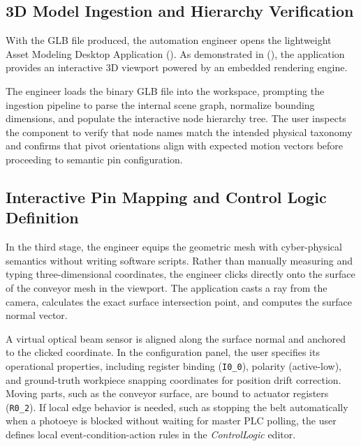 \subsection{3D Model Ingestion and Hierarchy Verification}
With the \gls{GLB} file produced, the automation engineer opens the lightweight Asset Modeling Desktop Application (). As demonstrated in  (), the application provides an interactive 3D viewport powered by an embedded rendering engine. 

The engineer loads the binary \gls{GLB} file into the workspace, prompting the ingestion pipeline to parse the internal scene graph, normalize bounding dimensions, and populate the interactive node hierarchy tree. The user inspects the component to verify that node names match the intended physical taxonomy and confirms that pivot orientations align with expected motion vectors before proceeding to semantic pin configuration.

\subsection{Interactive Pin Mapping and Control Logic Definition}
In the third stage, the engineer equips the geometric mesh with cyber-physical semantics without writing software scripts. Rather than manually measuring and typing three-dimensional coordinates, the engineer clicks directly onto the surface of the conveyor mesh in the viewport. The application casts a ray from the camera, calculates the exact surface intersection point, and computes the surface normal vector.

A virtual optical beam sensor is aligned along the surface normal and anchored to the clicked coordinate. In the configuration panel, the user specifies its operational properties, including register binding (\texttt{I0\_0}), polarity (active-low), and ground-truth workpiece snapping coordinates for position drift correction. Moving parts, such as the conveyor surface, are bound to actuator registers (\texttt{R0\_2}). If local edge behavior is needed, such as stopping the belt automatically when a photoeye is blocked without waiting for master \gls{PLC} polling, the user defines local event-condition-action rules in the \textit{ControlLogic} editor.

